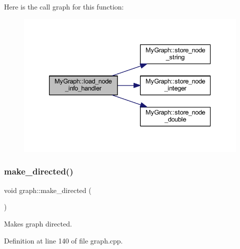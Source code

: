 Here is the call graph for this function\+:
\nopagebreak
\begin{figure}[H]
\begin{center}
\leavevmode
\includegraphics[width=333pt]{class_my_graph_acef355f66e5aeb19265a9860f2920381_cgraph}
\end{center}
\end{figure}
\mbox{\label{classgraph_a1615678dee6248d6d8a00c553770b3bd}} 
\subsubsection{\texorpdfstring{make\+\_\+directed()}{make\_directed()}}
{\footnotesize\ttfamily void graph\+::make\+\_\+directed (\begin{DoxyParamCaption}{ }\end{DoxyParamCaption})\hspace{0.3cm}{\ttfamily [inherited]}}

Makes graph directed. 

Definition at line 140 of file graph.\+cpp.


